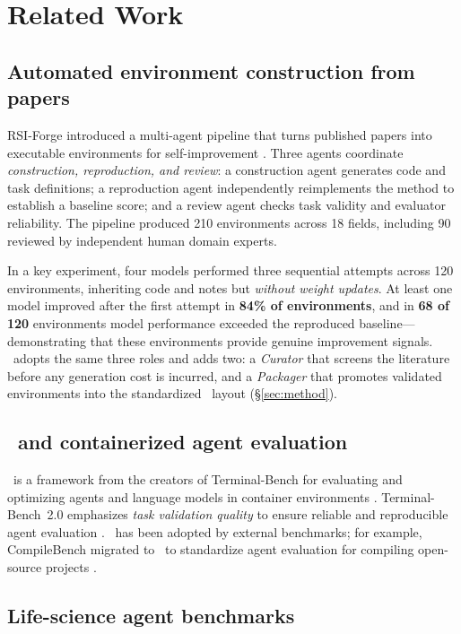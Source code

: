 \section{Related Work}
\label{sec:related}

\subsection{Automated environment construction from papers}

RSI-Forge introduced a multi-agent pipeline that turns published papers into
executable environments for self-improvement \cite{rsi-forge}. Three agents
coordinate \emph{construction, reproduction, and review}: a construction agent
generates code and task definitions; a reproduction agent independently
reimplements the method to establish a baseline score; and a review agent checks
task validity and evaluator reliability. The pipeline produced 210 environments
across 18 fields, including 90 reviewed by independent human domain experts.

In a key experiment, four models performed three sequential attempts across 120
environments, inheriting code and notes but \emph{without weight updates}. At
least one model improved after the first attempt in \textbf{84\% of
environments}, and in \textbf{68 of 120} environments model performance exceeded
the reproduced baseline---demonstrating that these environments provide genuine
improvement signals. \sys\ adopts the same three roles and adds two: a
\emph{Curator} that screens the literature before any generation cost is
incurred, and a \emph{Packager} that promotes validated environments into the
standardized \harbor\ layout (\S\ref{sec:method}).

\subsection{\harbor\ and containerized agent evaluation}

\harbor\ is a framework from the creators of Terminal-Bench for evaluating and
optimizing agents and language models in container environments \cite{harbor}.
Terminal-Bench~2.0 emphasizes \emph{task validation quality} to ensure reliable
and reproducible agent evaluation \cite{terminalbench}. \harbor\ has been
adopted by external benchmarks; for example, CompileBench migrated to \harbor\
to standardize agent evaluation for compiling open-source projects
\cite{compilebench}.

\subsection{Life-science agent benchmarks}

